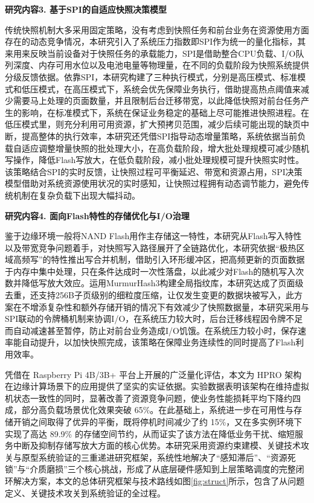 \textbf{研究内容3. 基于SPI的自适应快照决策模型}

传统快照机制大多采用固定策略，没有考虑到快照任务和前台业务在资源使用方面存在的动态竞争情况，本研究引入了系统压力指数即SPI作为统一的量化指标，其来用来反映当前设备对于快照任务的承载能力，SPI是借助整合CPU负载、I/O队列深度、内存可用水位以及电池电量等物理量，在不同的负载阶段为快照系统提供分级反馈依据。依靠SPI，本研究构建了三种执行模式，分别是高压模式、标准模式和低压模式，在高压模式下，系统会优先保障业务执行，借助提高热点阈值来减少需要马上处理的页面数量，并且限制后台迁移带宽，以此降低快照对前台任务产生的影响，在标准模式下，系统在保证业务稳定的基础上尽可能推进快照进程。在低压模式里，则充分利用可用资源，扩大预拷贝范围，减少后续可能出现的缺页中断，提高整体的执行效率，本研究还凭借SPI指导动态增量策略，系统依据当前负载自适应调整增量快照的批处理大小，在高负载阶段，增大批处理规模可减少随机写操作，降低Flash写放大，在低负载阶段，减小批处理规模可提升快照实时性。该策略结合SPI的实时反馈，让快照过程可平衡延迟、带宽和资源占用，SPI决策模型借助对系统资源使用状况的实时感知，让快照过程拥有动态调节能力，避免传统机制在复杂负载下出现大幅抖动。

\textbf{研究内容4. 面向Flash特性的存储优化与I/O治理}

鉴于边缘环境一般将NAND Flash用作主存储这一特性，本研究从Flash写入特性以及带宽竞争问题着手，对快照写入路径展开了全链路优化，本研究依据“极热区域高频写”的特性推出写合并机制，借助引入环形缓冲区，把高频更新的页面数据于内存中集中处理，只在条件达成时一次性落盘，以此减少对Flash的随机写入次数并降低写放大效应。运用MurmurHash3\cite{murmurhash3}构建全局指纹库，本研究达成了页面级去重，还支持256B子页级别的细粒度压缩，让仅发生变更的数据块被写入，此方案在不增添复杂性和额外存储开销的情况下有效减少了快照数据量，本研究采用与SPI联动的令牌桶机制来协调I/O，在系统压力较大时，后台迁移线程因令牌不足而自动减速甚至暂停，防止对前台业务造成I/O饥饿。在系统压力较小时，保存速率能自动提升，以加快快照完成，该策略在保障业务连续性的同时提高了Flash利用效率。

凭借在 Raspberry Pi 4B/3B+ 平台上开展的广泛量化评估，本文为 HPRO 架构在边缘计算场景下的应用提供了坚实的实证依据。实验数据表明该架构在维持虚拟机状态一致性的同时，显著改善了资源竞争问题，使业务性能损耗平均下降约四成，部分高负载场景优化效果突破 65\%。在此基础上，系统进一步在可用性与存储开销之间取得了优异的平衡，既将停机时间减少了约 15\%，又在多实例环境下实现了高达 89.9\% 的存储空间节约，从而证实了该方法在降低业务干扰、缩短服务中断及抑制存储写放大方面的核心优势。本研究采用资源约束建模、关键技术攻关与原型系统验证的三重递进研究框架，系统性地解决了“感知滞后”、“资源死锁”与“介质磨损”三个核心挑战，形成了从底层硬件感知到上层策略调度的完整闭环解决方案，本文的总体研究框架与技术路线如图\ref{fig:struct}所示，包含了从问题定义、关键技术攻关到系统验证的全过程。

